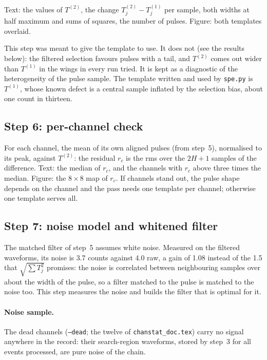 \documentclass[11pt]{article}
\newcommand{\code}[1]{\texttt{#1}}
\begin{document}
Text: the values of $T^{(2)}$, the change $T^{(2)}_j - T^{(1)}_j$ per
sample, both widths at half maximum and sums of squares, the number of
pulses. Figure: both templates overlaid.

This step was meant to give the template to use. It does not (see the
results below): the filtered selection favours pulses with a tail, and
$T^{(2)}$ comes out wider than $T^{(1)}$ in the wings in every run tried.
It is kept as a diagnostic of the heterogeneity of the pulse sample.
The template written and used by \code{spe.py} is $T^{(1)}$, whose known
defect is a central sample inflated by the selection bias, about one
count in thirteen.

\subsection{Step 6: per-channel check}

For each channel, the mean of its own aligned pulses (from step~5),
normalised to its peak, against $T^{(2)}$: the residual $r_c$ is the rms
over the $2H + 1$ samples of the difference. Text: the median of $r_c$,
and the channels with $r_c$ above three times the median. Figure: the
$8\times8$ map of $r_c$. If channels stand out, the pulse shape depends
on the channel and the pass needs one template per channel; otherwise
one template serves all.

\subsection{Step 7: noise model and whitened filter}

The matched filter of step~5 assumes white noise. Measured on the
filtered waveforms, its noise is 3.7 counts against 4.0 raw, a gain of
1.08 instead of the 1.5 that $\sqrt{\sum T_j^2}$ promises: the noise is
correlated between neighbouring samples over about the width of the
pulse, so a filter matched to the pulse is matched to the noise too.
This step measures the noise and builds the filter that is optimal for
it.

\paragraph{Noise sample.} The dead channels (\code{--dead}; the twelve of
\code{chanstat\_doc.tex}) carry no signal anywhere in the record: their
search-region waveforms, stored by step~3 for all events processed, are
pure noise of the chain.
\end{document}

